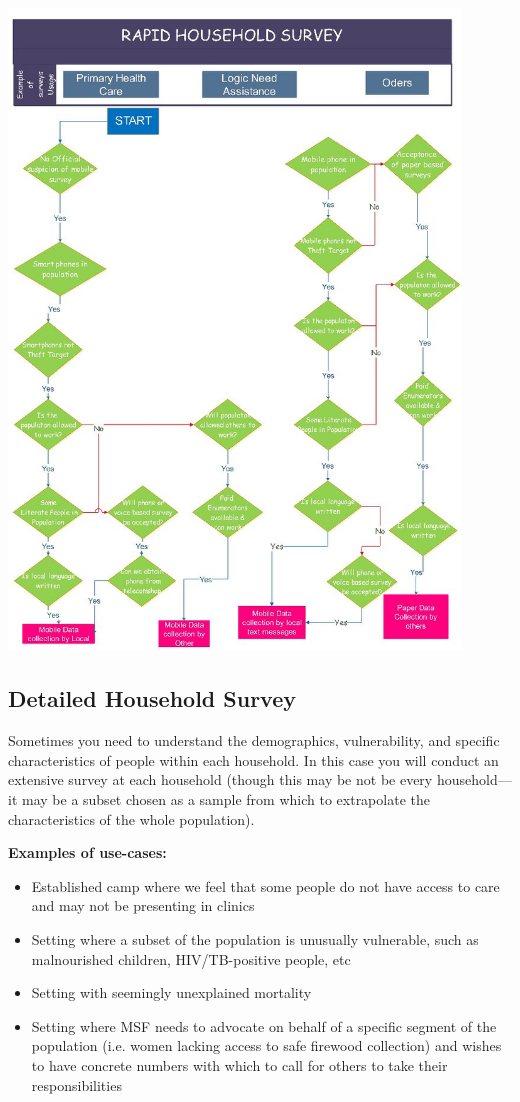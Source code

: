 \documentclass[a4paper,12pt,twoside]{article}
\begin{document}
\includegraphics[width=0.9\textwidth]{images/Rapid_Household_Survey.jpeg}

\subsection{Detailed Household Survey}
Sometimes you need to understand the demographics, vulnerability, and specific characteristics of people within each household. In this case you will conduct an extensive survey at each household (though this may be not be every household---it may be a subset chosen as a sample from which to extrapolate the characteristics of the whole population). 

\noindent
\textbf{Examples of use-cases:}
\begin{itemize}
    \item Established camp where we feel that some people do not have access to care and may not be presenting in clinics
    \item Setting where a subset of the population is unusually vulnerable, such as malnourished children, HIV/TB-positive people, etc
    \item Setting with seemingly unexplained mortality
    \item Setting where MSF needs to advocate on behalf of a specific segment of the population (i.e. women lacking access to safe firewood collection) and wishes to have concrete numbers with which to call for others to take their responsibilities
\end{itemize}
\end{document}
